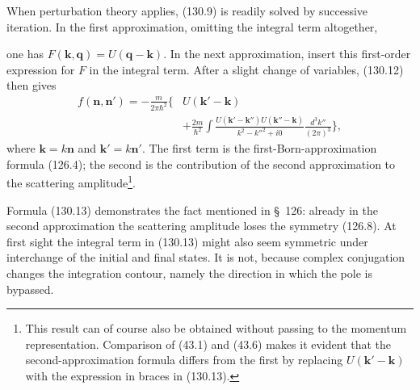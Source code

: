 When perturbation theory applies, (130.9) is readily solved by successive
iteration. In the first approximation, omitting the integral term altogether,

one has $F(\mathbf k,\mathbf q)=U(\mathbf q-\mathbf k)$. In the next
approximation, insert this first-order expression for $F$ in the integral term.
After a slight change of variables, (130.12) then gives
\begin{equation}
 \begin{split}
 f(\mathbf n,\mathbf n')=-\frac{m}{2\pi\hbar^2}\Bigg\{
 &U(\mathbf k'-\mathbf k)\\
 &+\frac{2m}{\hbar^2}\int
 \frac{U(\mathbf k'-\mathbf k'')U(\mathbf k''-\mathbf k)}
 {k^2-k''^2+i0}\frac{d^3k''}{(2\pi)^3}\Bigg\},
 \end{split}
 \tag{130.13}
\end{equation}
where $\mathbf k=k\mathbf n$ and $\mathbf k'=k\mathbf n'$. The first term is
the first-Born-approximation formula (126.4); the second is the contribution of
the second approximation to the scattering amplitude\footnote{This result can
of course also be obtained without passing to the momentum representation.
Comparison of (43.1) and (43.6) makes it evident that the second-approximation
formula differs from the first by replacing $U(\mathbf k'-\mathbf k)$ with the
expression in braces in (130.13).}.

Formula (130.13) demonstrates the fact mentioned in \S~126: already in the
second approximation the scattering amplitude loses the symmetry (126.8). At
first sight the integral term in (130.13) might also seem symmetric under
interchange of the initial and final states. It is not, because complex
conjugation changes the integration contour, namely the direction in which the
pole is bypassed.
